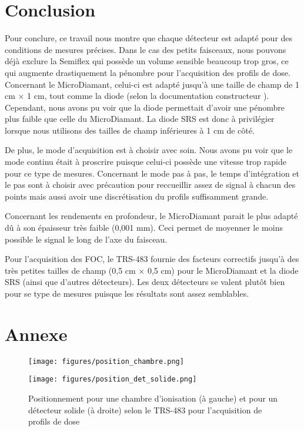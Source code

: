 \documentclass{article}
\begin{document}
\section{Conclusion}

Pour conclure, ce travail nous montre que chaque détecteur est adapté pour des conditions de mesures précises. Dans le cas des petits faisceaux, nous pouvons déjà exclure la Semiflex qui possède un volume sensible beaucoup trop gros, ce qui augmente drastiquement la pénombre pour l'acquisition des profils de dose. Concernant le MicroDiamant, celui-ci est adapté jusqu'à une taille de champ de 1 cm $\times$ 1 cm, tout comme la diode (selon la documentation constructeur \cite{doc_petits_champs_PTW}). Cependant, nous avons pu voir que la diode permettait d'avoir une pénombre plus faible que celle du MicroDiamant. La diode SRS est donc à privilégier lorsque nous utilisons des tailles de champ inférieures à 1 cm de côté. 

De plus, le mode d'acquisition est à choisir avec soin. Nous avons pu voir que le mode continu était à proscrire puisque celui-ci possède une vitesse trop rapide pour ce type de mesures. Concernant le mode pas à pas, le temps d'intégration et le pas sont à choisir avec précaution pour reccueillir assez de signal à chacun des points mais aussi avoir une discrétisation du profils suffisamment grande.

Concernant les rendements en profondeur, le MicroDiamant parait le plus adapté dû à son épaisseur très faible (0,001 mm). Ceci permet de moyenner le moins possible le signal le long de l'axe du faisceau.

Pour l'acquisition des FOC, le TRS-483 fournie des facteurs correctifs jusqu'à des très petites tailles de champ (0,5 cm $\times$ 0,5 cm) pour le MicroDiamant et la diode SRS (ainsi que d'autres détecteurs). Les deux détecteurs se valent plutôt bien pour se type de mesures puisque les résultats sont assez semblables.

\clearpage
\section{Annexe}

\begin{figure}[h]
  \begin{minipage}{.5\linewidth}
    \texttt{[image: figures/position\_chambre.png]}
  \end{minipage}
  \begin{minipage}{.5\linewidth}
    \texttt{[image: figures/position\_det\_solide.png]}
  \end{minipage}
  \caption{Positionnement pour une chambre d'ionisation (à gauche) et pour un détecteur solide (à droite) selon le TRS-483 pour l'acquisition de profils de dose}
  \label{recommandations_placement_detecteur}
\end{figure}
\end{document}
